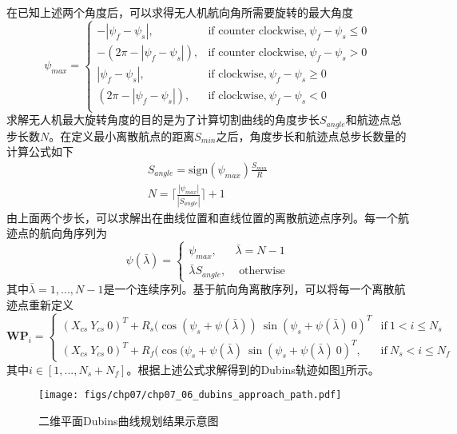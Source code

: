 在已知上述两个角度后，可以求得无人机航向角所需要旋转的最大角度
\begin{equation}
\psi_{max} = \left\{ \begin{array}{ll}
-|\psi_f-\psi_s|, & \text{if counter clockwise,}\ \psi_f - \psi_s \le 0\\  
-(2\pi-|\psi_f - \psi_s|),& \text{if counter clockwise,}\ \psi_f -  \psi_s > 0\\
|\psi_f-\psi_s|, & \text{if clockwise,}\ \psi_f - \psi_s \ge 0\\
(2\pi - |\psi_f - \psi_s|) ,& \text{if clockwise,}\ \psi_f - \psi_s < 0\\
\end{array} 
\right.
\end{equation}
求解无人机最大旋转角度的目的是为了计算切割曲线的角度步长$S_{angle}$和航迹点总步长数$N$。在定义最小离散航点的距离$S_{min}$之后，角度步长和航迹点总步长数量的计算公式如下
\begin{align}
S_{angle} = \text{sign} (\psi_{max}) \frac{S_{min}}{R} \\
N = \lceil \frac{|\psi_{max}|}{|S_{angle}|} \rceil+1
\end{align}
由上面两个步长，可以求解出在曲线位置和直线位置的离散航迹点序列。每一个航迹点的航向角序列为
\begin{equation}
\psi(\bar{\lambda}) = \left\{ \begin{array}{ll}
\psi_{max}, &  \bar{\lambda}=N-1\\
\bar{\lambda}S_{angle}, &\mbox{ otherwise}
\end{array} \right.
\end{equation}
其中$\bar{\lambda} = 1, ..., N-1$是一个连续序列。基于航向角离散序列，可以将每一个离散航迹点重新定义
\begin{equation}
\mathbf{WP}_{i} = \left\{ \begin{array}{ll}
(X_{cs}\ Y_{cs}\  0)^T +R_s (\cos (\psi_s+\psi(\bar{\lambda}))\ \sin(\psi_s+\psi(\bar{\lambda}) \ 0)^T& \text{if}\ 1< i \le N_s\\
(X_{cs}\ Y_{cs}\ 0)^T + R_f(\cos(\psi_s+\psi(\bar{\lambda})\ \sin(\psi_s+\psi(\bar{\lambda}) \ 0)^T, & \text{if}\ N_s< i \le N_f
\end{array} \right.
\end{equation}
其中$i \in [1, ..., N_s+N_f]$。根据上述公式求解得到的Dubins轨迹如图\ref{fig:chp07_06_dubins_approach_path}所示。
\begin{figure}[ht]   
	\centering
	\texttt{[image: figs/chp07/chp07\_06\_dubins\_approach\_path.pdf]}
	\caption{二维平面Dubins曲线规划结果示意图}
	\label{fig:chp07_06_dubins_approach_path}
\end{figure}


